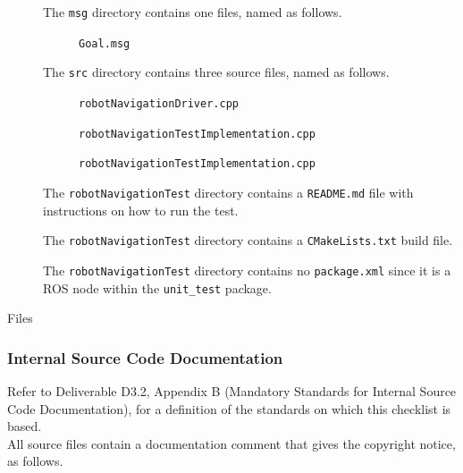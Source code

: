 \documentclass{CSSRforAfrica}
\newcommand{\checkboxChecked}{\fbox{\ding{51}}} %
\begin{document}
\begin{description}
\item[\checkboxChecked] The  {\small \verb+msg+} directory contains one files, named as follows.
\begin{description}
\item[\checkboxChecked] {\small \verb+Goal.msg+}  
\end{description} 

\item[\checkboxChecked] The  {\small \verb+src+} directory contains three source files, named as follows.
\begin{description}
\item[\checkboxChecked] {\small \verb+robotNavigationDriver.cpp+}  
\item[\checkboxChecked]  {\small \verb+robotNavigationTestImplementation.cpp+}  
\item[\checkboxChecked]  {\small \verb+robotNavigationTestImplementation.cpp+}  
\end{description}

\item[\checkboxChecked] The {\small \verb+robotNavigationTest+} directory contains a {\small \verb+README.md+} file with instructions on how to run the test.

\item[\checkboxChecked] The {\small \verb+robotNavigationTest+} directory contains a {\small \verb+CMakeLists.txt+} build file.

\item[\checkboxChecked] The {\small \verb+robotNavigationTest+} directory contains no {\small \verb+package.xml+} since it is a ROS node within the {\small \verb+unit_test+} package.

\end{description}Files

\subsubsection{Internal Source Code Documentation}

Refer to Deliverable D3.2, Appendix B (Mandatory Standards for Internal Source Code Documentation), for a definition of the standards on which this checklist is based.\\

\noindent All source files contain a documentation comment that gives the copyright notice, as follows.
\end{document}
